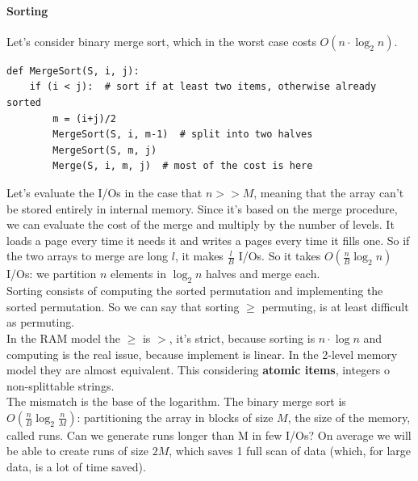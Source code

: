 \documentclass[10pt]{report}
\begin{document}
\paragraph{Sorting} Let's consider binary merge sort, which in the worst case costs $O(n\cdot \log_2 n)$.
\begin{lstlisting}[style=myPython]
def MergeSort(S, i, j):
	if (i < j):  # sort if at least two items, otherwise already sorted
		m = (i+j)/2
		MergeSort(S, i, m-1)  # split into two halves
		MergeSort(S, m, j)
		Merge(S, i, m, j)  # most of the cost is here
\end{lstlisting}
Let's evaluate the I/Os in the case that $n >> M$, meaning that the array can't be stored entirely in internal memory. Since it's based on the merge procedure, we can evaluate the cost of the merge and multiply by the number of levels. It loads a page every time it needs it and writes a pages every time it fills one. So if the two arrays to merge are long $l$, it makes $\frac{l}{B}$ I/Os. So it takes $O(\frac{n}{B} \log_2 n)$ I/Os: we partition $n$ elements in $\log_2 n$ halves and merge each.\\
Sorting consists of computing the sorted permutation and implementing the sorted permutation. So we can say that sorting $\geq$ permuting, is at least difficult as permuting.\\
In the RAM model the $\geq$ is $>$, it's strict, because sorting is $n\cdot\log n$ and computing is the real issue, because implement is linear. In the 2-level memory model they are almost equivalent. This considering \textbf{atomic items}, integers o non-splittable strings.\\
The mismatch is the base of the logarithm. The binary merge sort is $O(\frac{n}{B} \log_2 \frac{n}{M})$: partitioning the array in blocks of size $M$, the size of the memory, called runs. Can we generate runs longer than M in few I/Os? On average we will be able to create runs of size $2M$, which saves 1 full scan of data (which, for large data, is a lot of time saved).
\end{document}
